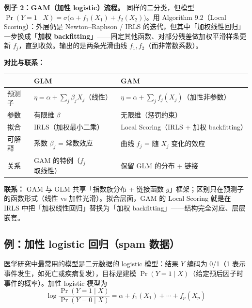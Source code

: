 \textbf{例子 2：GAM（加性 logistic）流程。} 同样的二分类，但模型 $\Pr(Y=1 \mid X) = \sigma\bigl(\alpha + f_1(X_1) + f_2(X_2)\bigr)$。用 Algorithm 9.2（Local Scoring）：外层仍是 Newton--Raphson / IRLS 的迭代，但其中「加权线性回归」一步换成「\textbf{加权 backfitting}」——固定其他函数、对部分残差做加权平滑样条更新 $f_j$，直到收敛。输出的是两条光滑曲线 $f_1, f_2$（而非常数系数）。

\textbf{对比与联系：}
\begin{center}
\begin{tabular}{lll}
\toprule
 & GLM & GAM \\
\midrule
预测子 & $\eta = \alpha + \sum_j \beta_j X_j$（线性） & $\eta = \alpha + \sum_j f_j(X_j)$（加性非参数）\\
参数 & 有限维 $\beta$ & 无限维（惩罚约束）\\
拟合 & IRLS（加权最小二乘） & Local Scoring（IRLS + 加权 backfitting）\\
可解释 & 系数 $\beta_j$ = 常数效应 & 曲线 $f_j$ = 随 $X_j$ 变化的效应\\
关系 & GAM 的特例（$f_j$ 取线性） & 保留 GLM 的分布 + 链接 \\
\bottomrule
\end{tabular}
\end{center}
\textbf{联系：} GAM 与 GLM 共享「指数族分布 + 链接函数 $g$」框架；区别只在预测子的函数形式（线性 vs 加性光滑）。拟合层面，GAM 的 Local Scoring 就是在 IRLS 中把「加权线性回归」替换为「加权 backfitting」——结构完全对应、层层嵌套。

\subsection{例：加性 logistic 回归（spam 数据）}

医学研究中最常用的模型是二元数据的 logistic 模型：结果 $Y$ 编码为 0/1（1 表示事件发生，如死亡或疾病复发），目标是建模 $\Pr(Y=1 \mid X)$（给定预后因子时事件的概率）。加性 logistic 模型为
\begin{equation}\label{eq:9_8}
    \log\frac{\Pr(Y=1 \mid X)}{\Pr(Y=0 \mid X)} = \alpha + f_1(X_1) + \cdots + f_p(X_p)
\end{equation}

